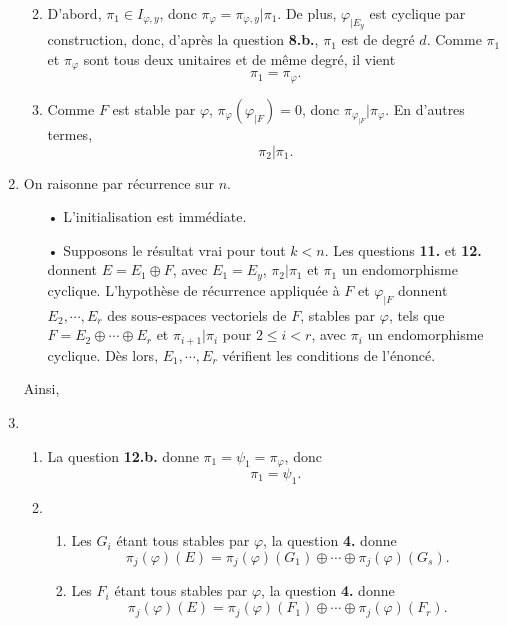 \documentclass[a4paper,11pt]{article}
\begin{document}
\begin{enumerate}
\begin{enumerate}
\begin{center}
\end{center}
\item D'abord, $\pi_1\in I_{\varphi,y}$, donc $\pi_\varphi=\pi_{\varphi,y}\vert\pi_1$. De plus, $\varphi_{\vert E_y}$ est cyclique par construction, donc, d'après la question {\sffamily\bfseries 8.b.}, $\pi_1$ est de degré $d$. Comme $\pi_1$ et $\pi_\varphi$ sont tous deux unitaires et de même degré, il vient
\[\boxed{\pi_1=\pi_\varphi.}\]
\item Comme $F$ est stable par $\varphi$, $\pi_\varphi\left(\varphi_{\vert F}\right)=0$, donc $\pi_{\varphi_{\vert F}}\vert\pi_\varphi$. En d'autres termes,
\[\boxed{\pi_2\vert\pi_1.}\]
\end{enumerate}
\item On raisonne par récurrence sur $n$.
\begin{itemize}
\item[•] L'initialisation est immédiate.
\item[•] Supposons le résultat vrai pour tout $k<n$. Les questions {\sffamily\bfseries 11.} et {\sffamily\bfseries 12.} donnent $E=E_1\oplus F$, avec $E_1=E_y$, $\pi_2\vert\pi_1$ et $\pi_1$ un endomorphisme cyclique. L'hypothèse de récurrence appliquée à $F$ et $\varphi_{\vert F}$ donnent $E_2,\cdots,E_r$ des sous-espaces vectoriels de $F$, stables par $\varphi$, tels que $F=E_2\oplus\cdots\oplus E_r$ et $\pi_{i+1}\vert\pi_i$ pour $2\leq i<r$, avec $\pi_i$ un endomorphisme cyclique. Dès lors, $E_1,\cdots,E_r$ vérifient les conditions de l'énoncé.
\end{itemize}
Ainsi,
\begin{center}
\end{center}
\item 
\begin{enumerate}
\item La question {\sffamily\bfseries 12.b.} donne $\pi_1=\psi_1=\pi_\varphi$, donc
\[\boxed{\pi_1=\psi_1.}\]
\item 
\begin{enumerate}
\item Les $G_i$ étant tous stables par $\varphi$, la question {\sffamily\bfseries 4.} donne
\[\boxed{\pi_j(\varphi)(E)=\pi_j(\varphi)(G_1)\oplus\cdots\oplus \pi_j(\varphi)(G_s).}\]
\item Les $F_i$ étant tous stables par $\varphi$, la question {\sffamily\bfseries 4.} donne
\[\pi_j(\varphi)(E)=\pi_j(\varphi)(F_1)\oplus\cdots\oplus \pi_j(\varphi)(F_r).\]

\end{enumerate}
\end{enumerate}
\end{enumerate}
\end{document}
